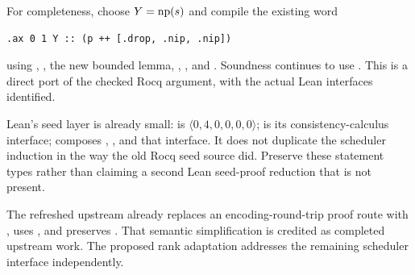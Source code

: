 For completeness, choose $Y=\operatorname{np}(s)$ and compile the existing word
\begin{lstlisting}
.ax 0 1 Y :: (p ++ [.drop, .nip, .nip])
\end{lstlisting}
using , , the new bounded lemma, , , and . Soundness continues to use . This is a direct port of the checked Rocq argument, with the actual Lean interfaces identified.

Lean's seed layer is already small:  is $\langle 0, 4, 0, 0, 0, 0\rangle$;  is its consistency-calculus interface;  composes , , and that interface. It does not duplicate the scheduler induction in the way the old Rocq seed source did. Preserve these statement types rather than claiming a second Lean seed-proof reduction that is not present.

The refreshed upstream  already replaces an encoding-round-trip proof route with , uses , and preserves . That semantic simplification is credited as completed upstream work. The proposed rank adaptation addresses the remaining scheduler interface independently.
